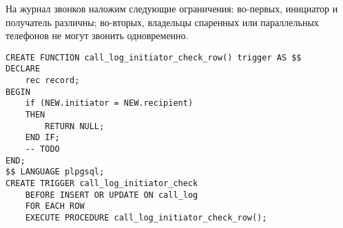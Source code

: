 \documentclass{report}
\begin{document}
На журнал звонков наложим следующие ограничения: во-первых,
инициатор и получатель различны; во-вторых, владельцы спаренных или 
параллельных телефонов не могут звонить одновременно.

\begin{lstlisting}
CREATE FUNCTION call_log_initiator_check_row() trigger AS $$
DECLARE
    rec record;
BEGIN
    if (NEW.initiator = NEW.recipient)
    THEN 
        RETURN NULL;
    END IF;
    -- TODO
END;
$$ LANGUAGE plpgsql;
CREATE TRIGGER call_log_initiator_check 
    BEFORE INSERT OR UPDATE ON call_log
    FOR EACH ROW 
    EXECUTE PROCEDURE call_log_initiator_check_row();
\end{lstlisting}
\end{document}
